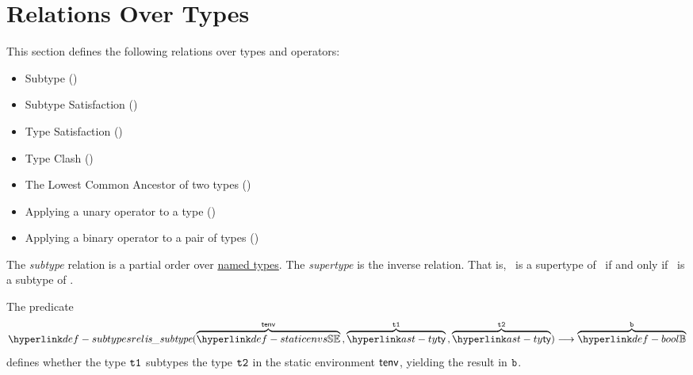 \section{Relations Over Types\label{sec:RelationsOnTypes}}
This section defines the following relations over types and operators:
\begin{itemize}
  \item Subtype ()
  \item Subtype Satisfaction ()
  \item Type Satisfaction ()
  \item Type Clash ()
  \item The Lowest Common Ancestor of two types ()
  \item Applying a unary operator to a type ()
  \item Applying a binary operator to a pair of types ()
\end{itemize}

The \emph{subtype} relation is a partial order over \underline{named types}.
The \emph{supertype} is the inverse relation. That is, \tty\ is a supertype of \tsy\ if and only if \tsy\ is a subtype of \tty.

\hypertarget{def-subtypesrel}{}
The predicate
\[
  \subtypesrel(\overname{\staticenvs}{\tenv} \aslsep \overname{\ty}{\vtone} \aslsep \overname{\ty}{\vttwo})
  \aslto \overname{\Bool}{\vb}
\]
defines whether the type $\texttt{t1}$ subtypes the type $\texttt{t2}$ in the static environment $\textsf{tenv}$,
yielding the result in $\texttt{b}$.

